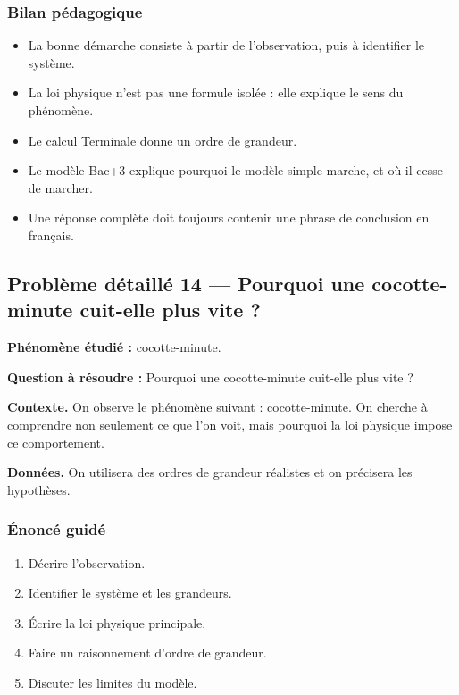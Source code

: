 \documentclass[11pt,a4paper]{article}
\begin{document}
\subsubsection*{Bilan pédagogique}

\begin{methodebox}
\begin{itemize}
  \item La bonne démarche consiste à partir de l'observation, puis à identifier le système.
  \item La loi physique n'est pas une formule isolée : elle explique le sens du phénomène.
  \item Le calcul Terminale donne un ordre de grandeur.
  \item Le modèle Bac+3 explique pourquoi le modèle simple marche, et où il cesse de marcher.
  \item Une réponse complète doit toujours contenir une phrase de conclusion en français.
\end{itemize}
\end{methodebox}

\subsection{Problème détaillé 14 — Pourquoi une cocotte-minute cuit-elle plus vite ?}

\begin{exercicebox}
\textbf{Phénomène étudié :} cocotte-minute.

\medskip
\textbf{Question à résoudre :} Pourquoi une cocotte-minute cuit-elle plus vite ?

\medskip
\textbf{Contexte.} On observe le phénomène suivant : cocotte-minute. On cherche à comprendre non seulement ce que l'on voit, mais pourquoi la loi physique impose ce comportement.

\medskip
\textbf{Données.} On utilisera des ordres de grandeur réalistes et on précisera les hypothèses.
\end{exercicebox}

\subsubsection*{Énoncé guidé}

\begin{enumerate}
  \item Décrire l'observation.
  \item Identifier le système et les grandeurs.
  \item Écrire la loi physique principale.
  \item Faire un raisonnement d'ordre de grandeur.
  \item Discuter les limites du modèle.
\end{enumerate}
\end{document}
